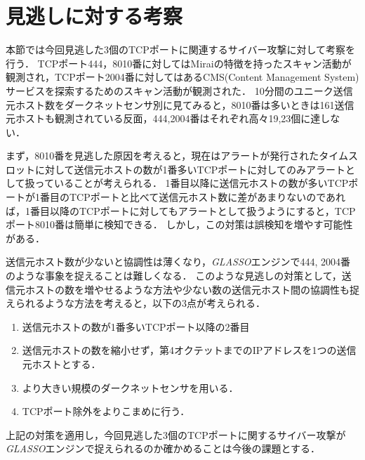 \documentclass[conference]{IEEEtran}
\begin{document}
\section{見逃しに対する考察}
本節では今回見逃した3個のTCPポートに関連するサイバー攻撃に対して考察を行う．
TCPポート444，8010番に対してはMiraiの特徴を持ったスキャン活動が観測され，TCPポート2004番に対してはあるCMS(Content Management System)サービスを探索するためのスキャン活動が観測された．
10分間のユニーク送信元ホスト数をダークネットセンサ別に見てみると，8010番は多いときは161送信元ホストも観測されている反面，444,2004番はそれぞれ高々19,23個に達しない．

まず，8010番を見逃した原因を考えると，現在はアラートが発行されたタイムスロットに対して送信元ホストの数が1番多いTCPポートに対してのみアラートとして扱っていることが考えられる．
1番目以降に送信元ホストの数が多いTCPポートが1番目のTCPポートと比べて送信元ホスト数に差があまりないのであれば，1番目以降のTCPポートに対してもアラートとして扱うようにすると，TCPポート8010番は簡単に検知できる．
しかし，この対策は誤検知を増やす可能性がある．

送信元ホスト数が少ないと協調性は薄くなり，{\it GLASSO}エンジンで444, 2004番のような事象を捉えることは難しくなる．
このような見逃しの対策として，送信元ホストの数を増やせるような方法や少ない数の送信元ホスト間の協調性も捉えられるような方法を考えると，以下の3点が考えられる．
\begin{enumerate}
  \item 送信元ホストの数が1番多いTCPポート以降の2番目
  \item 送信元ホストの数を縮小せず，第4オクテットまでのIPアドレスを1つの送信元ホストとする．
  \item より大きい規模のダークネットセンサを用いる．
  \item TCPポート除外をよりこまめに行う．
\end{enumerate}
上記の対策を適用し，今回見逃した3個のTCPポートに関するサイバー攻撃が{\it GLASSO}エンジンで捉えられるのか確かめることは今後の課題とする．




\end{document}
